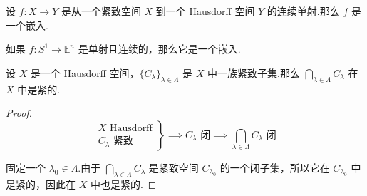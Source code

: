 \begin{proposition}[][prop:6.5]
    设 $f: X \to Y$ 是从一个紧致空间 $X$ 到一个 Hausdorff 空间 $Y$ 的连续单射.那么 $f$ 是一个嵌入.
\end{proposition}

\begin{instance}
    如果 $f: S^1 \to \mathbb{E}^n$ 是单射且连续的，那么它是一个嵌入.
\end{instance}

\begin{lemma}[][lem:6.2]
    设 $X$ 是一个 Hausdorff 空间，$\{C_\lambda\}_{\lambda \in \Lambda}$ 是 $X$ 中一族紧致子集.那么 $\bigcap_{\lambda \in \Lambda} C_\lambda$ 在 $X$ 中是紧的.
\end{lemma}
\begin{proof}
    \[
        \left.
        \begin{array}{r}
            X \text{ Hausdorff} \\
            C_\lambda \text{ 紧致}
        \end{array}
        \right\} \implies C_\lambda \text{ 闭} \implies \bigcap_{\lambda \in \Lambda} C_\lambda \text{ 闭}
    \]\par
    固定一个 $\lambda_0 \in \Lambda$.由于 $\bigcap_{\lambda \in \Lambda} C_\lambda$ 是紧致空间 $C_{\lambda_0}$ 的一个闭子集，所以它在 $C_{\lambda_0}$ 中是紧的，因此在 $X$ 中也是紧的.
\end{proof}


